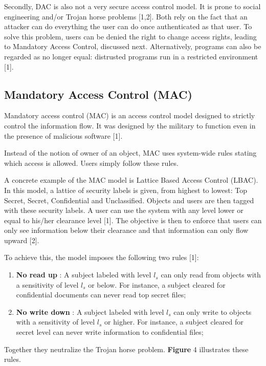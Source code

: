 Secondly, DAC is also not a very secure access control model. It is prone to social engineering and/or Trojan horse problems [1,2]. Both rely on the fact that an attacker can do everything the user can do once authenticated as that user. To solve this problem, users can be denied the right to change access rights, leading to Mandatory Access Control, discussed next. Alternatively, programs can also be regarded as no longer equal: distrusted programs run in a restricted environment [1].



\subsection{Mandatory Access Control (MAC)}

Mandatory access control (MAC) is an access control model designed to strictly control the information flow. It was designed by the military to function even in the presence of malicious software [1].

Instead of the notion of owner of an object, MAC uses system-wide rules stating which access is allowed. Users simply follow these rules.

A concrete example of the MAC model is Lattice Based Access Control (LBAC). In this model, a lattice of security labels is given, from highest to lowest: Top Secret, Secret, Confidential and Unclassified. Objects and users are then tagged with these security labels. A user can use the system with any level lower or equal to his/her clearance level [1]. The objective is then to enforce that users can only see information below their clearance and that information can only flow upward [2].

To achieve this, the model imposes the following two rules [1]:
\begin{enumerate}
	\item \textbf{No read up} : A subject labeled with level $l_{s}$ can only read from objects with a sensitivity of level $l_{s}$ or below. For instance, a subject cleared for confidential documents can never read top secret files;
	\item \textbf{No write down} : A subject labeled with level $l_{s}$ can only write to objects with a sensitivity of level $l_{s}$ or higher. For instance, a subject cleared for secret level can never write information to confidential files;
\end{enumerate}

Together they neutralize the Trojan horse problem. \textbf{Figure} 4 illustrates these rules.


